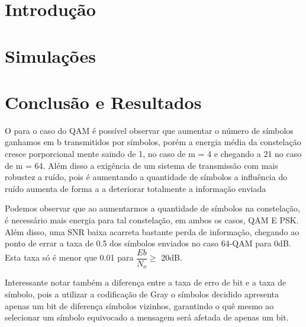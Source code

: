 \documentclass[a4paper, 12pt]{article}
\begin{document}



% 

\section{Introdução}

\section{Simulações}

\clearpage

\clearpage

\clearpage

\clearpage

\clearpage

\section{Conclusão e Resultados}

O para o caso do QAM é possível observar que aumentar o número de símbolos ganhamos em b transmitidos por símbolos, porém a energia média da constelação cresce porporcional mente saindo de 1, no caso de m = 4 e chegando a 21 no caso de m = 64. Além disso a exigência de um sistema de transmissão com mais robustez a ruído, pois é aumentando a quantidade de símbolos a influência do ruído aumenta de forma a a deteriorar totalmente a informação enviada

Podemos observar que ao aumentarmos a quantidade de símbolos na constelação, é necessário mais energia para tal constelação, em ambos os casos, QAM E PSK. Além disso, uma SNR baixa acarreta bastante perda de informação, chegando ao ponto de errar a taxa de 0.5 dos símbolos enviados no caso 64-QAM para 0dB. Esta taxa só é menor que 0.01 para $\dfrac{Eb}{N_o} \geq $ 20dB.

Interessante notar também a diferença entre a taxa de erro de bit e a taxa de símbolo, pois a utilizar a codificação de Gray o símbolos decidido apresenta apenas um bit de diferença símbolos vizinhos, garantindo o quê mesmo ao selecionar um símbolo equivocado a mensagem será afetada de apenas um bit.


\clearpage

\printbibliography[heading=bibintoc]    %
\end{document}
